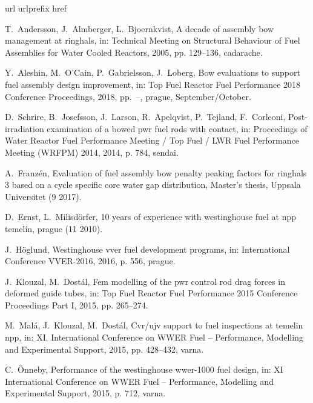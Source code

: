 \documentclass[preprint,12pt]{elsarticle}
\begin{document}
  
\begin{thebibliography}{10}
\expandafter\ifx\csname url\endcsname\relax
  \def\url#1{\texttt{#1}}\fi
\expandafter\ifx\csname urlprefix\endcsname\relax\def\urlprefix{URL }\fi
\expandafter\ifx\csname href\endcsname\relax
  \def\href#1#2{#2} \def\path#1{#1}\fi

T.~Andersson, J.~Almberger, L.~Bjoernkvist, A decade of assembly bow management
  at ringhals, in: Technical Meeting on Structural Behaviour of Fuel Assemblies
  for Water Cooled Reactors, 2005, pp. 129--136, cadarache.

Y.~Aleshin, M.~O'Cain, P.~Gabrielsson, J.~Loberg, Bow evaluations to support
  fuel assembly design improvement, in: Top Fuel Reactor Fuel Performance 2018
  Conference Proceedings, 2018, pp.~--, prague, September/October.

D.~Schrire, B.~Josefsson, J.~Larson, R.~Apelqvist, P.~Tejland, F.~Corleoni,
  Post-irradiation examination of a bowed pwr fuel rods with contact, in:
  Proceedings of Water Reactor Fuel Performance Meeting / Top Fuel / LWR Fuel
  Performance Meeting (WRFPM) 2014, 2014, p. 784, sendai.

A.~Franzén, Evaluation of fuel assembly bow penalty peaking factors for
  ringhals 3 based on a cycle specific core water gap distribution, Master's
  thesis, Uppsala Universitet (9 2017).

D.~Ernst, L.~Milisdörfer, 10 years of experience with westinghouse fuel at npp
  temelín, prague (11 2010).

J.~Höglund, Westinghouse vver fuel development programs, in: International
  Conference VVER-2016, 2016, p. 556, prague.

J.~Klouzal, M.~Dostál, Fem modelling of the pwr control rod drag forces in
  deformed guide tubes, in: Top Fuel Reactor Fuel Performance 2015 Conference
  Proceedings Part I, 2015, pp. 265--274.

M.~Mal\'{a}, J.~Klouzal, M.~Dost\'{a}l, Cvr/ujv support to fuel inspections at
  temelin npp, in: XI. International Conference on WWER Fuel – Performance,
  Modelling and Experimental Support, 2015, pp. 428--432, varna.

C.~Önneby, Performance of the westinghouse wwer-1000 fuel design, in: XI
  International Conference on WWER Fuel – Performance, Modelling and
  Experimental Support, 2015, p. 712, varna.


\end{thebibliography}
\end{document}
